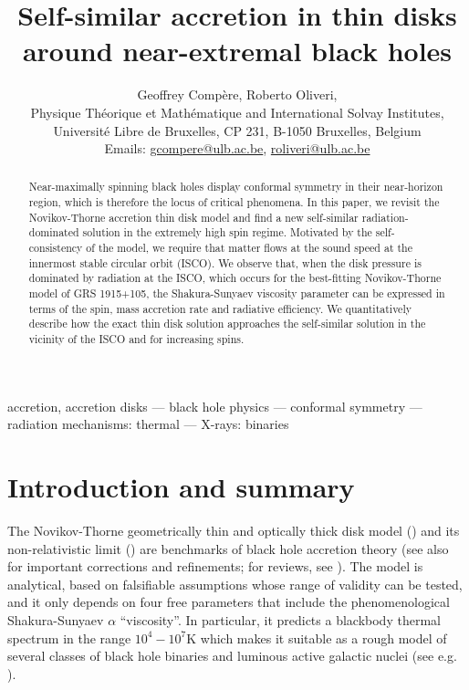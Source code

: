 \documentclass[a4paper,fleqn,usenatbib]{mnrasMOD}
\title[Self-similar accretion in thin disks around near-extremal black holes]{Self-similar accretion in thin disks around near-extremal black holes}
\author[]{%
Geoffrey Comp\`ere,
Roberto Oliveri,
\vspace{0.2cm}
\\
Physique Th\'eorique et Math\'ematique and International Solvay Institutes, \\
Universit\'e Libre de Bruxelles, CP 231, B-1050 Bruxelles, Belgium\vspace{0.1cm}\\
Emails: \href{mailto: gcompere@ulb.ac.be}{gcompere@ulb.ac.be}, \href{mailto: roliveri@ulb.ac.be}{roliveri@ulb.ac.be}
}
\numberwithin{equation}{section}
\begin{document}
\label{firstpage}
\pagerange{\pageref{firstpage}--\pageref{lastpage}}
\maketitle


\begin{abstract}
Near-maximally spinning black holes display conformal symmetry in their near-horizon region, which is therefore the locus of critical phenomena. 
In this paper, we revisit the Novikov-Thorne accretion thin disk model and find a new self-similar radiation-dominated solution in the extremely high spin regime. Motivated by the self-consistency of the model, we require that matter flows at the sound speed at the innermost stable circular orbit (ISCO). We observe that, when the disk pressure is dominated by radiation at the ISCO, which occurs for the best-fitting Novikov-Thorne model of GRS 1915+105, the Shakura-Sunyaev viscosity parameter can be expressed in terms of the spin, mass accretion rate and radiative efficiency. We quantitatively describe how the exact thin disk solution approaches the self-similar solution in the vicinity of the ISCO and for increasing spins. 
\vspace{0.0cm}
\end{abstract}

\begin{keywords} accretion, accretion disks --- black hole physics --- conformal symmetry --- radiation mechanisms: thermal --- X-rays: binaries 
\end{keywords}


\begingroup
\let\clearpage\relax
\tableofcontents
\endgroup
\vspace{-0.6cm}



\section{Introduction and summary}

The Novikov-Thorne geometrically thin and optically thick disk model (\cite{25334}) and its non-relativistic limit (\cite{1973A&A....24..337S}) are benchmarks of black hole accretion theory (see also \cite{25341,1975ApJ...200..187E,25363,1997ApJ...479..179A,2002ApJ...567..463L} for important corrections and refinements; for reviews, see \cite{Blaes:2002wz,2007A&ARv..15....1D,lrr-2013-1,Blaes:2013toa,2014ARA&A..52..529Y,2016ASSL..440....1L}). The model is analytical, based on falsifiable assumptions whose range of validity can be tested, and it only depends on four free parameters that include the phenomenological Shakura-Sunyaev $\alpha$ ``viscosity''. In particular, it predicts a blackbody thermal spectrum in the range $10^4-10^7$K which makes it suitable as a rough model of several classes of black hole binaries and luminous active galactic nuclei (see e.g. \cite{1999PASP..111....1K,McClintock:2013vwa}). 
\end{document}

